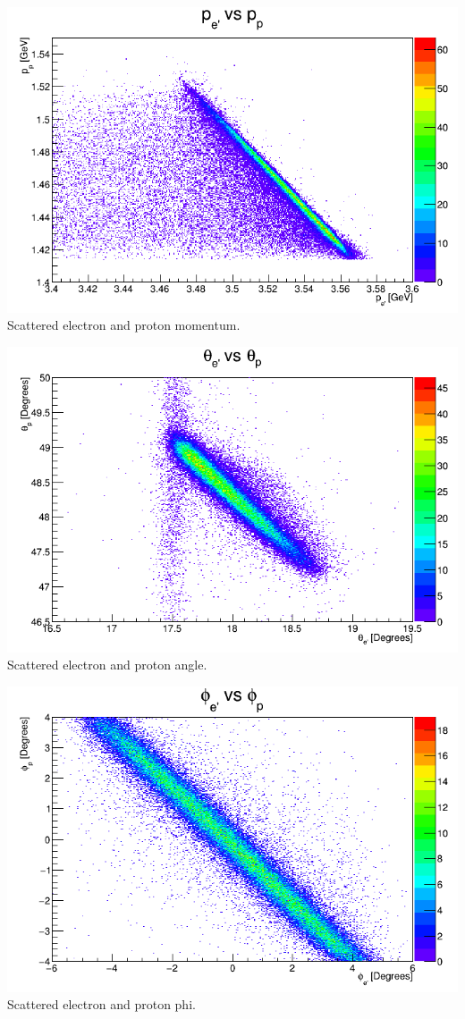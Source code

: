\documentclass{article}
\begin{document}
\begin{center}
\includegraphics[width=15cm]{Pp_Pe.png}\\
Scattered electron and proton momentum.
\end{center}

\begin{center}
\includegraphics[width=15cm]{Tp_Te.png}\\
Scattered electron and proton angle.
\end{center}

\begin{center}
\includegraphics[width=15cm]{DelPhi.png}\\
Scattered electron and proton phi.
\end{center}
\end{document}
